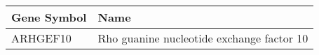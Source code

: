\begin{tabular}{ll}
\toprule
Gene Symbol &                                      Name \\
\midrule
   ARHGEF10 & Rho guanine nucleotide exchange factor 10 \\
\bottomrule
\end{tabular}
